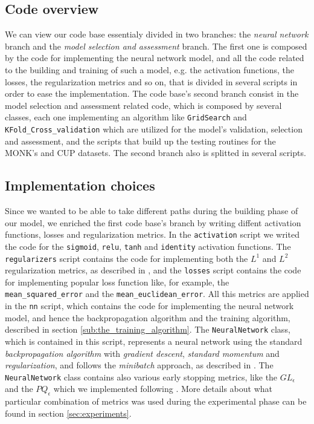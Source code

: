 \documentclass[11pt,twoside]{article}
\begin{document}
    \subsection{Code overview} %
    \label{sub:code_overview}
        We can view our code base essentialy divided in two branches: the \textit{neural network} branch and
        the \textit{model selection and assessment} branch. The first one is composed by the code for
        implementing the neural network model, and all the code related
        to the building and training of such a model, e.g. the activation functions, the losses, the
        regularization metrics and so on, that is divided in several scripts in order to ease the
        implementation. The code base's second branch consist in the model selection and assessment related
        code, which is composed by several classes, each one implementing an algorithm like \texttt{GridSearch}
        and \texttt{KFold\_Cross\_validation} which are utilized for the model's validation, selection and
        assessment, and the scripts that build up the testing routines for the MONK's and CUP datasets.
        The second branch also is splitted in several scripts.

    \subsection{Implementation choices} %
    \label{sub:implementation_choices}
        Since we wanted to be able to take different paths during the building phase of our model, we enriched
        the first code base's branch by writing diffent activation functions, losses and regularization metrics.
        In the \texttt{activation} script we writed the code for the \texttt{sigmoid}, \texttt{relu},
        \texttt{tanh} and \texttt{identity} activation functions. The \texttt{regularizers} script contains the
        code for implementing both the $L^1$ and $L^2$ regularization metrics, as described in
        \cite{deep_learning}, and the \texttt{losses} script contains the code for implementing popular loss
        function like, for example, the \texttt{mean\_squared\_error} and the \texttt{mean\_euclidean\_error}.
        All this metrics are applied in the \texttt{nn} script, which contains the code for implementing the
        neural network model, and hence the backpropagation algorithm and the training algorithm, described in
        section \ref{sub:the_training_algorithm}. The \texttt{NeuralNetwork} class, which is contained in this
        script, represents a neural network using the standard \textit{backpropagation algorithm} with
        \textit{gradient descent}, \textit{standard momentum} and \textit{regularization}, and follows the
        \textit{minibatch} approach, as described in \cite{deep_learning}. The \texttt{NeuralNetwork} class
        contains also various early stopping metrics, like the $GL_{\epsilon}$ and the $PQ_{\epsilon}$ which we
        implemented following \cite{early_stopping}. More details about what particular combination of
        metrics was used during the experimental phase can be found in section \ref{sec:experiments}.
\end{document}

